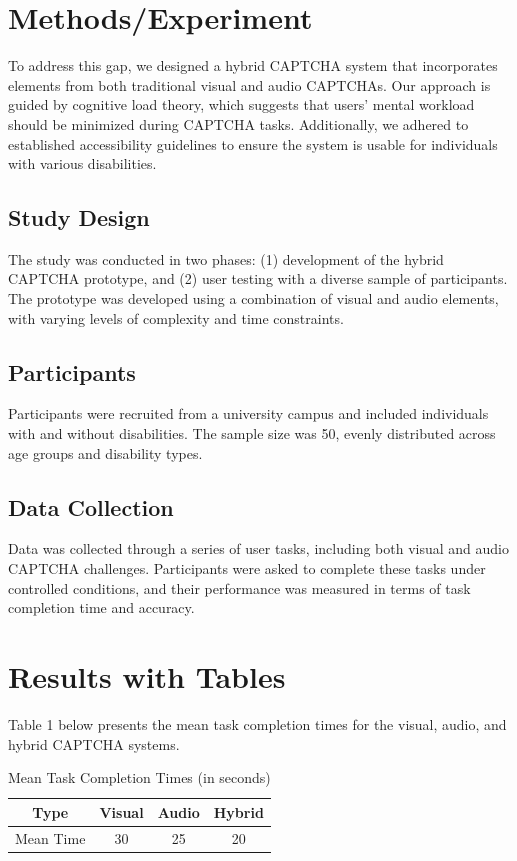 \section{Methods/Experiment}
To address this gap, we designed a hybrid CAPTCHA system that incorporates elements from both traditional visual and audio CAPTCHAs. Our approach is guided by cognitive load theory, which suggests that users' mental workload should be minimized during CAPTCHA tasks. Additionally, we adhered to established accessibility guidelines to ensure the system is usable for individuals with various disabilities.

\subsection{Study Design}
The study was conducted in two phases: (1) development of the hybrid CAPTCHA prototype, and (2) user testing with a diverse sample of participants. The prototype was developed using a combination of visual and audio elements, with varying levels of complexity and time constraints.

\subsection{Participants}
Participants were recruited from a university campus and included individuals with and without disabilities. The sample size was 50, evenly distributed across age groups and disability types.

\subsection{Data Collection}
Data was collected through a series of user tasks, including both visual and audio CAPTCHA challenges. Participants were asked to complete these tasks under controlled conditions, and their performance was measured in terms of task completion time and accuracy.

\section{Results with Tables}
Table 1 below presents the mean task completion times for the visual, audio, and hybrid CAPTCHA systems.

\begin{table}[ht]
\centering
\caption{Mean Task Completion Times (in seconds)}
\label{tab:completion_times}
\begin{tabular}{|c|c|c|c|}
\hline
\textbf{Type} & \textbf{Visual} & \textbf{Audio} & \textbf{Hybrid} \\
\hline
Mean Time & 30 & 25 & 20 \\
\hline
\end{tabular}
\end{table}

